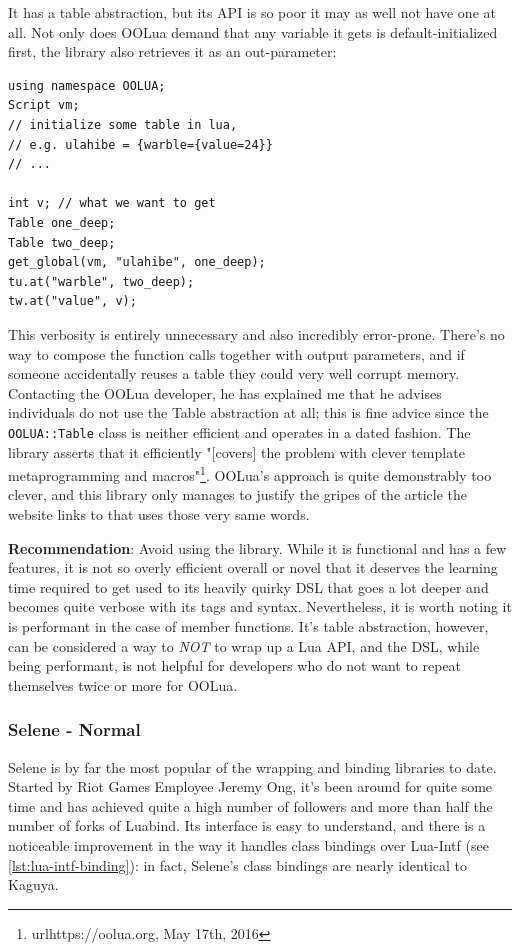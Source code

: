 \documentclass[conference,compsoc]{IEEEtran}
\begin{document}
It has a table abstraction, but its API is so poor it may as well not have one at all. Not only does OOLua demand that any variable it gets is default-initialized first, the library also retrieves it as an out-parameter:

\begin{lstlisting}
using namespace OOLUA;
Script vm;
// initialize some table in lua, 
// e.g. ulahibe = {warble={value=24}}
// ...

int v; // what we want to get
Table one_deep;
Table two_deep;
get_global(vm, "ulahibe", one_deep);
tu.at("warble", two_deep);
tw.at("value", v);
\end{lstlisting}

This verbosity is entirely unnecessary and also incredibly error-prone. There's no way to compose the function calls together with output parameters, and if someone accidentally reuses a table they could very well corrupt memory. Contacting the OOLua developer, he has explained me that he advises individuals do not use the Table abstraction at all; this is fine advice since the \lstinline|OOLUA::Table| class is neither efficient and operates in a dated fashion. The library asserts that it efficiently "[covers] the problem with clever template metaprogramming and macros"\footnote{url{https://oolua.org}, May 17th, 2016}. OOLua's approach is quite demonstrably too clever, and this library only manages to justify the gripes of the article the website links to that uses those very same words.

\textbf{Recommendation}: Avoid using the library. While it is functional and has a few features, it is not so overly efficient overall or novel that it deserves the learning time required to get used to its heavily quirky DSL that goes a lot deeper and becomes quite verbose with its tags and syntax. Nevertheless, it is worth noting it is performant in the case of member functions. It's table abstraction, however, can be considered a way to \emph{NOT} to wrap up a Lua API, and the DSL, while being performant, is not helpful for developers who do not want to repeat themselves twice or more for OOLua.

\subsubsection{Selene - Normal}

Selene\cite{selene} is by far the most popular of the wrapping and binding libraries to date. Started by Riot Games Employee Jeremy Ong, it's been around for quite some time and has achieved quite a high number of followers and more than half the number of forks of Luabind. Its interface is easy to understand, and there is a noticeable improvement in the way it handles class bindings over Lua-Intf (see \cref{lst:lua-intf-binding}): in fact, Selene's class bindings are nearly identical to Kaguya.
\end{document}
